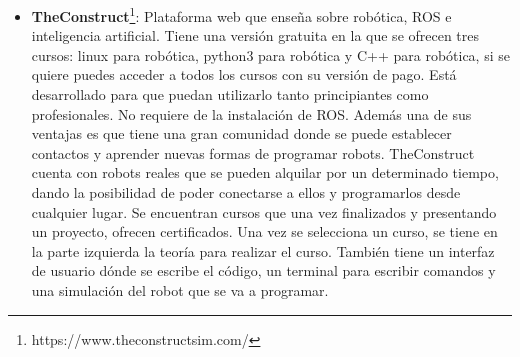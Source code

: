\begin{itemize}
\item \textbf{TheConstruct}\footnote{https://www.theconstructsim.com/}: Plataforma web que enseña sobre robótica, ROS e inteligencia artificial. Tiene una versión gratuita en la que se ofrecen tres cursos: linux para robótica, python3 para robótica y C++ para robótica, si se quiere puedes acceder a todos los cursos con su versión de pago. Está desarrollado para que puedan utilizarlo tanto principiantes como profesionales. No requiere de la instalación de ROS. Además una de sus ventajas es que tiene una gran comunidad donde se puede establecer contactos y aprender nuevas formas de programar robots. TheConstruct cuenta con robots reales que se pueden alquilar por un determinado tiempo, dando la posibilidad de poder conectarse a ellos y programarlos desde cualquier lugar. Se encuentran cursos que una vez finalizados y presentando un proyecto, ofrecen certificados. Una vez se selecciona un curso, se tiene en la parte izquierda la teoría para realizar el curso. También tiene un interfaz de usuario dónde se escribe el código, un terminal para escribir comandos y una simulación del robot que se va a programar.


\end{itemize}
